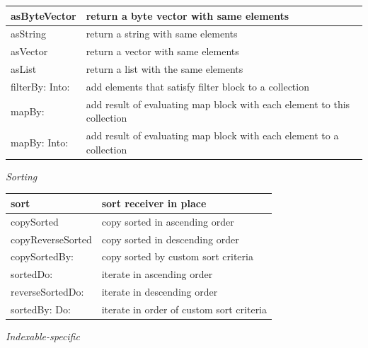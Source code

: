 \documentclass[letterpaper,10pt,english]{sphinxmanual}
\begin{document}
\begin{tabulary}{\linewidth}{p{5cm} p{10cm}}
\hline

asByteVector
 & 
return a byte vector with same elements
\\\hline

asString
 & 
return a string with same elements
\\\hline

asVector
 & 
return a vector with same elements
\\\hline

asList
 & 
return a list with the same elements
\\\hline

filterBy: Into:
 & 
add elements that satisfy filter block to a collection
\\\hline

mapBy:
 & 
add result of evaluating map block with each element to this collection
\\\hline

mapBy: Into:
 & 
add result of evaluating map block with each element to a collection
\\\hline
\end{tabulary}


\emph{Sorting}

\begin{tabulary}{\linewidth}{p{5cm} p{10cm}}
\hline

sort
 & 
sort receiver in place
\\\hline

copySorted
 & 
copy sorted in ascending order
\\\hline

copyReverseSorted
 & 
copy sorted in descending order
\\\hline

copySortedBy:
 & 
copy sorted by custom sort criteria
\\\hline

sortedDo:
 & 
iterate in ascending order
\\\hline

reverseSortedDo:
 & 
iterate in descending order
\\\hline

sortedBy: Do:
 & 
iterate in order of custom sort criteria
\\\hline
\end{tabulary}


\emph{Indexable-specific}
\end{document}
